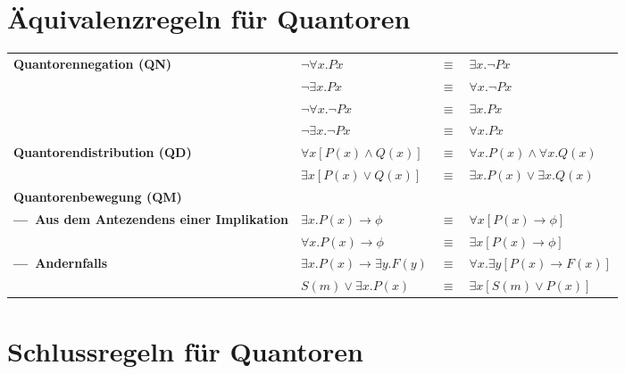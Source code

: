 \documentclass[10.5pt,oneside,a4paper]{paper}
\begin{document}
    \vspace{-0.5\baselineskip}

\section{Äquivalenzregeln für Quantoren}

    \begin{tabular}[h]{p{}p{}cl}
      \textbf{Quantorennegation (QN)}  & $\neg\forall x.Px$ & $\equiv$ & $\exists x.\neg Px$ \\
      \textbf{}  & $\neg\exists x.Px$      & $\equiv$ & $\forall x.\neg Px$ \\
      \textbf{}  & $\neg\forall x.\neg Px$ & $\equiv$ & $\exists x.Px$ \\
      \textbf{}  & $\neg\exists x.\neg Px$ & $\equiv$ & $\forall x.Px$ \\
      \textbf{Quantorendistribution (QD) }  & $\forall x[P(x)\wedge Q(x)]$ & $\equiv$ & $\forall x.P(x)\wedge\forall x.Q(x)$ \\
      \textbf{}                             & $\exists x[P(x)\vee Q(x)]$   & $\equiv$ & $\exists x.P(x)\vee\exists x.Q(x)$ \\
      \textbf{Quantorenbewegung (QM)}       &&& \\
      \textbf{---\ Aus dem Antezendens einer Implikation} & $\exists x.P(x)\rightarrow\phi$ & $\equiv$ & $\forall x[P(x)\rightarrow\phi]$\\
                                            & $\forall x.P(x)\rightarrow\phi$ & $\equiv$ & $\exists x[P(x)\rightarrow\phi]$ \\
      \textbf{---\ Andernfalls} & $\exists x.P(x)\rightarrow\exists y.F(y)$ & $\equiv$ & $\forall x.\exists y[P(x)\rightarrow F(x)]$ \\
                           & $S(m)\vee \exists x.P(x)$ & $\equiv$ & $\exists x[S(m)\vee P(x)]$ \\
    \end{tabular}

    \vspace{-0.5\baselineskip}

\section{Schlussregeln für Quantoren}
\end{document}
